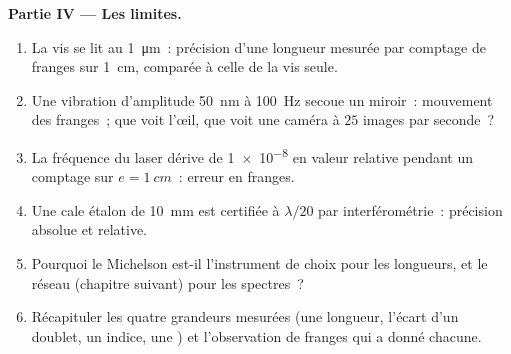 \begin{problem}
\medskip
\noindent\textbf{Partie IV --- Les limites.}
\begin{enumerate}[resume]
  \item La vis se lit au \qty{1}{\micro m}~: précision d'une longueur
        mesurée par comptage de franges sur \qty{1}{cm}, comparée à celle de la vis
        seule.
  \item Une vibration d'amplitude \qty{50}{nm} à \qty{100}{Hz} secoue un
        miroir~: mouvement des franges~; que voit l'œil, que voit une
        caméra à $25$ images par seconde~?
  \item La fréquence du laser dérive de \qty{1e-8}{} en valeur relative
        pendant un comptage sur $e = \qty{1}{cm}$~: erreur en franges.
  \item Une cale étalon de \qty{10}{mm} est certifiée à $\lambda/20$ par
        interférométrie~: précision absolue et relative.
  \item Pourquoi le Michelson est-il l'instrument de choix pour les longueurs, et
        le réseau (chapitre suivant) pour les spectres~?
  \item Récapituler les quatre grandeurs mesurées (une longueur, l'écart d'un
        doublet, un indice, une ) et l'observation de
        franges qui a donné chacune.
\end{enumerate}
\end{problem}
